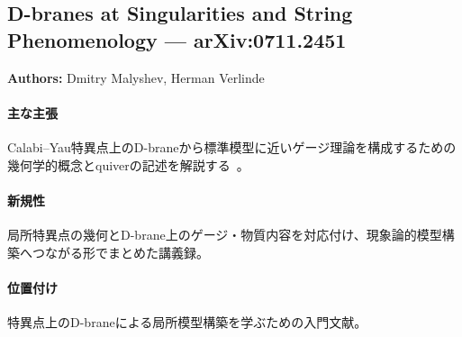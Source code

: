 \subsection{D-branes at Singularities and String Phenomenology --- arXiv:0711.2451}

\textbf{Authors:} Dmitry Malyshev, Herman Verlinde

\paragraph{主な主張}
Calabi--Yau特異点上のD-braneから標準模型に近いゲージ理論を構成するための幾何学的概念とquiverの記述を解説する~\cite{Malyshev:2007zz}。

\paragraph{新規性}
局所特異点の幾何とD-brane上のゲージ・物質内容を対応付け、現象論的模型構築へつながる形でまとめた講義録。

\paragraph{位置付け}
特異点上のD-braneによる局所模型構築を学ぶための入門文献。
